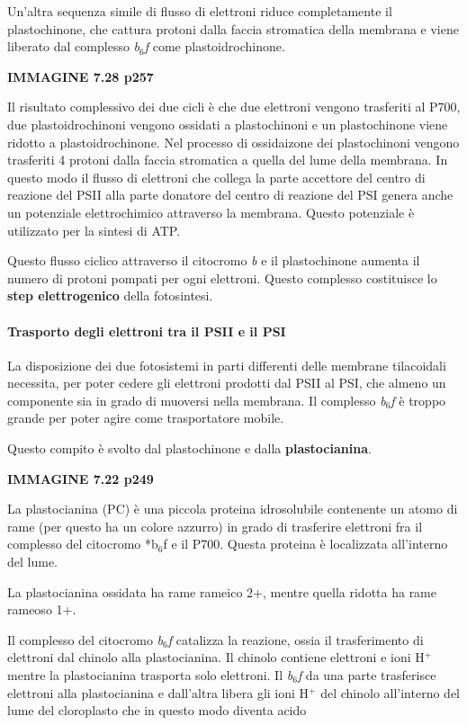 \documentclass[]{article}
\begin{document}
Un'altra sequenza simile di flusso di elettroni riduce completamente il
plastochinone, che cattura protoni dalla faccia stromatica della
membrana e viene liberato dal complesso \emph{b$_6$f} come
plastoidrochinone.

\textbf{IMMAGINE 7.28 p257}

Il risultato complessivo dei due cicli è che due elettroni vengono
trasferiti al P700, due plastoidrochinoni vengono ossidati a
plastochinoni e un plastochinone viene ridotto a plastoidrochinone. Nel
processo di ossidaizone dei plastochinoni vengono trasferiti 4 protoni
dalla faccia stromatica a quella del lume della membrana. In questo modo
il flusso di elettroni che collega la parte accettore del centro di
reazione del PSII alla parte donatore del centro di reazione del PSI
genera anche un potenziale elettrochimico attraverso la membrana. Questo
potenziale è utilizzato per la sintesi di ATP.

Questo flusso ciclico attraverso il citocromo \emph{b} e il
plastochinone aumenta il numero di protoni pompati per ogni elettroni.
Questo complesso costituisce lo \textbf{step elettrogenico} della
fotosintesi.

\paragraph{Trasporto degli elettroni tra il PSII e il
PSI}\label{trasporto-degli-elettroni-tra-il-psii-e-il-psi}

La disposizione dei due fotosistemi in parti differenti delle membrane
tilacoidali necessita, per poter cedere gli elettroni prodotti dal PSII
al PSI, che almeno un componente sia in grado di muoversi nella
membrana. Il complesso \emph{b$_6$f} è troppo grande per poter agire
come trasportatore mobile.

Questo compito è svolto dal plastochinone e dalla
\textbf{plastocianina}.

\textbf{IMMAGINE 7.22 p249}

La plastocianina (PC) è una piccola proteina idrosolubile contenente un
atomo di rame (per questo ha un colore azzurro) in grado di trasferire
elettroni fra il complesso del citocromo *b$_6$f e il P700. Questa
proteina è localizzata all'interno del lume.

La plastocianina ossidata ha rame rameico 2+, mentre quella ridotta ha
rame rameoso 1+.

Il complesso del citocromo \emph{b$_6$f} catalizza la reazione, ossia il
trasferimento di elettroni dal chinolo alla plastocianina. Il chinolo
contiene elettroni e ioni H$^+$ mentre la plastocianina trasporta solo
elettroni. Il \emph{b$_6$f} da una parte trasferisce elettroni alla
plastocianina e dall'altra libera gli ioni H$^+$ del chinolo all'interno
del lume del cloroplasto che in questo modo diventa acido
\end{document}
